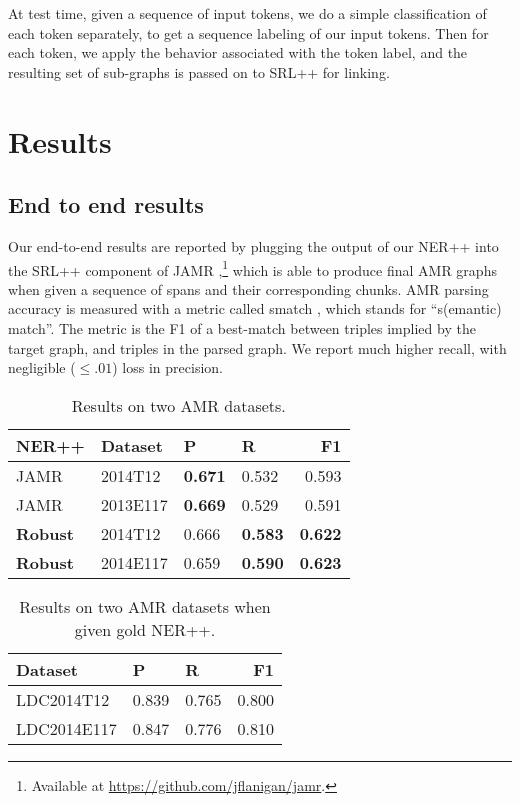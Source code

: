 \documentclass[11pt]{article}
\begin{document}
At test time, given a sequence of input tokens, we do a simple classification of each token separately, to get a sequence labeling of our input tokens. Then for each token, we apply the behavior associated with the token label, and the resulting set of sub-graphs is passed on to SRL++ for linking.

% 

\section{Results}

\subsection{End to end results}

Our end-to-end results are reported by plugging the output of our NER++ into the SRL++ component of JAMR \cite{2014flanigan-amr},\footnote
  {Available at \url{https://github.com/jflanigan/jamr}.}
which is able to produce final AMR graphs when given a sequence of spans and their corresponding chunks. AMR parsing accuracy is measured with a metric called smatch \needcite, which stands for ``s(emantic) match''. The metric is the F1 of a best-match between triples implied by the target graph, and triples in the parsed graph. We report much higher recall, with negligible ($\leq .01$) loss in precision.

\begin{table}[h]
\begin{center}
\begin{tabular}{|l|l|llr|}
\hline NER++ & Dataset & P & R & F1 \\ \hline
JAMR & 2014T12 & \textbf{0.671} & 0.532 & 0.593 \\
JAMR & 2013E117 & \textbf{0.669} & 0.529 & 0.591 \\
\textbf{Robust} & 2014T12 & 0.666 & \textbf{0.583} & \textbf{0.622} \\
\bf Robust & 2014E117 & 0.659 & \textbf{0.590} & \textbf{0.623} \\
\hline
\end{tabular}
\end{center}
\caption{\label{font-table} Results on two AMR datasets. }
\end{table}


\begin{table}[h]
\begin{center}
\begin{tabular}{|l|llr|}
\hline Dataset & P & R & F1 \\ \hline
LDC2014T12 & 0.839 & 0.765 & 0.800 \\
LDC2014E117 & 0.847 & 0.776 & 0.810 \\
\hline
\end{tabular}
\end{center}
\caption{\label{font-table} Results on two AMR datasets when given gold NER++. }
\end{table}
\end{document}
